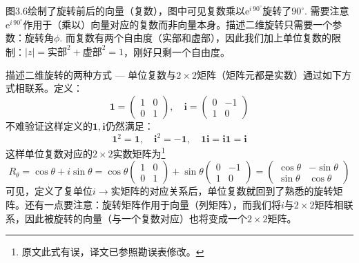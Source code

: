 图3.6绘制了旋转前后的向量（复数），图中可见复数乘以$\mathrm{e}^{i\, 90^\circ}$旋转了$90^\circ$.
需要注意$\mathrm{e}^{i\, 90^\circ}$作用于（乘以）向量对应的复数而非向量本身。描述二维旋转只需要一个参数：旋转角$\phi$. 而复数有两个自由度（实部和虚部），因此我们加上单位复数的限制：$|z| = \text{实部}^2 + \text{虚部}^2 = 1$，刚好只剩一个自由度。

描述二维旋转的两种方式 --- 单位复数与$2 \times 2$矩阵（矩阵元都是实数）通过如下方式相联系。定义：
\begin{equation}
\label{equ3.15}
\mathbf{1} =
	\begin{pmatrix}
		1 & 0 \\ 0 & 1
	\end{pmatrix}
,\quad
\mathbf{i} =
	\begin{pmatrix}
		0 & -1 \\ 1 & 0
	\end{pmatrix}
\end{equation}
不难验证这样定义的$\mathbf{1, i}$仍然满足：
\begin{equation}
\mathbf{1}^2 = \mathbf{1},\quad \mathbf{i}^2 = -\mathbf{1},\quad \mathbf{1i} = \mathbf{i1} = \mathbf{i}
\end{equation}
这样单位复数对应的$2 \times 2$实数矩阵为\footnote{原文此式有误，译文已参照勘误表修改。}
\begin{equation}
\label{equ3.17}
R_\theta = \cos \theta + i\sin\theta = \cos \theta
\begin{pmatrix}
	1 & 0 \\ 0 & 1
\end{pmatrix}
+ \sin \theta
\begin{pmatrix}
	0 & -1 \\ 1 & 0
\end{pmatrix}
=
\begin{pmatrix}
	\cos \theta & -\sin \theta \\
	\sin \theta & \cos \theta
\end{pmatrix}
\end{equation}
可见，定义了复单位$i \rightarrow \text{实矩阵}$的对应关系后，单位复数就回到了熟悉的旋转矩阵。还有一点要注意：旋转矩阵作用于向量（列矩阵），而我们将$i$与$2 \times 2$矩阵相联系，因此被旋转的向量（与一个复数对应）也将变成一个$2 \times 2$矩阵。

